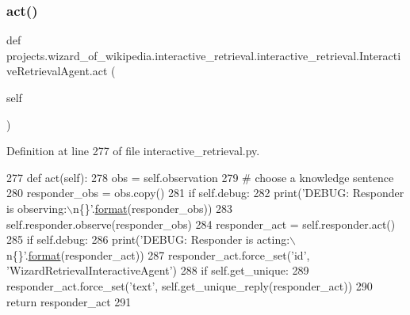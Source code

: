 \subsubsection{\texorpdfstring{act()}{act()}}
{\footnotesize\ttfamily def projects.\+wizard\+\_\+of\+\_\+wikipedia.\+interactive\+\_\+retrieval.\+interactive\+\_\+retrieval.\+Interactive\+Retrieval\+Agent.\+act (\begin{DoxyParamCaption}\item[{}]{self }\end{DoxyParamCaption})}



Definition at line 277 of file interactive\+\_\+retrieval.\+py.


\begin{DoxyCode}
277     \textcolor{keyword}{def }act(self):
278         obs = self.observation
279         \textcolor{comment}{# choose a knowledge sentence}
280         responder\_obs = obs.copy()
281         \textcolor{keywordflow}{if} self.debug:
282             print(\textcolor{stringliteral}{'DEBUG: Responder is observing:\(\backslash\)n\{\}'}.\hyperlink{namespaceparlai_1_1chat__service_1_1services_1_1messenger_1_1shared__utils_a32e2e2022b824fbaf80c747160b52a76}{format}(responder\_obs))
283         self.responder.observe(responder\_obs)
284         responder\_act = self.responder.act()
285         \textcolor{keywordflow}{if} self.debug:
286             print(\textcolor{stringliteral}{'DEBUG: Responder is acting:\(\backslash\)n\{\}'}.\hyperlink{namespaceparlai_1_1chat__service_1_1services_1_1messenger_1_1shared__utils_a32e2e2022b824fbaf80c747160b52a76}{format}(responder\_act))
287         responder\_act.force\_set(\textcolor{stringliteral}{'id'}, \textcolor{stringliteral}{'WizardRetrievalInteractiveAgent'})
288         \textcolor{keywordflow}{if} self.get\_unique:
289             responder\_act.force\_set(\textcolor{stringliteral}{'text'}, self.get\_unique\_reply(responder\_act))
290         \textcolor{keywordflow}{return} responder\_act
291 
\end{DoxyCode}
\mbox{\label{classprojects_1_1wizard__of__wikipedia_1_1interactive__retrieval_1_1interactive__retrieval_1_1InteractiveRetrievalAgent_a76b3efdd3e25c94f9532fe4d67df66b3}} 
